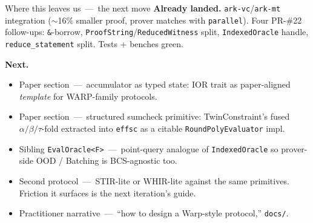 \documentclass[10pt,aspectratio=169]{beamer}
\begin{document}
\begin{frame}{Where this leaves us \,---\, the next move}
\small
\textbf{Already landed.}\;
\texttt{ark-vc}/\texttt{ark-mt} integration ($\sim$16\% smaller proof, prover matches with \texttt{parallel}). Four PR-\#22 follow-ups: \texttt{\&}-borrow, \texttt{ProofString}/\texttt{ReducedWitness} split, \texttt{IndexedOracle} handle, \texttt{reduce\_statement} split. Tests + benches green.

\vspace{0.5em}
\textbf{Next.}
\begin{itemize}\small
  \item Paper section \,---\, accumulator as typed state: IOR trait as paper-aligned \emph{template} for WARP-family protocols.
  \item Paper section \,---\, structured sumcheck primitive: TwinConstraint's fused $\alpha/\beta/\tau$-fold extracted into \texttt{effsc} as a citable \texttt{RoundPolyEvaluator} impl.
  \item Sibling \texttt{EvalOracle<F>} \,---\, point-query analogue of \texttt{IndexedOracle} so prover-side OOD / Batching is BCS-agnostic too.
  \item Second protocol \,---\, STIR-lite or WHIR-lite against the same primitives. Friction it surfaces is the next iteration's guide.
  \item Practitioner narrative \,---\, ``how to design a Warp-style protocol,'' \texttt{docs/}.
\end{itemize}
\end{frame}
\end{document}
